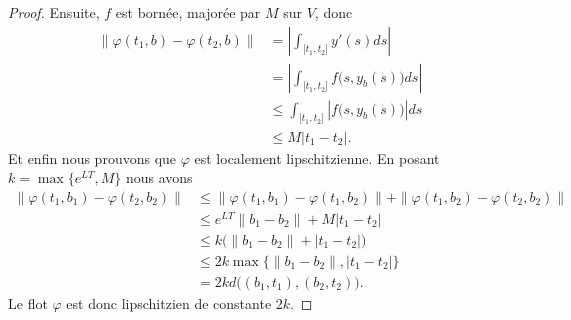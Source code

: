 \begin{proof}
	Ensuite, \( f\) est bornée, majorée par \( M\) sur \( V\), donc
	\begin{subequations}
		\begin{align}
			\| \varphi(t_1,b)-\varphi(t_2,b) \| & =| \int_{\mathopen[ t_1 , t_2 \mathclose]} y'(s)ds |                    \\
			                                    & =| \int_{\mathopen[ t_1 , t_2 \mathclose]}f\big( s,y_b(s) \big)ds |     \\
			                                    & \leq \int_{\mathopen[ t_1 , t_2 \mathclose]}| f\big( s,y_b(s) \big) |ds \\
			                                    & \leq M| t_1-t_2 |.
		\end{align}
	\end{subequations}
	Et enfin nous prouvons que \( \varphi\) est localement lipschitzienne. En posant \( k=\max\{  e^{LT},M \}\) nous avons
	\begin{subequations}
		\begin{align}
			\| \varphi(t_1,b_1)-\varphi(t_2,b_2) \| & \leq \| \varphi(t_1,b_1)-\varphi(t_1,b_2) \|+\| \varphi(t_1,b_2)-\varphi(t_2,b_2) \| \\
			                                        & \leq  e^{LT}\| b_1-b_2 \|+M| t_1-t_2 |                                               \\
			                                        & \leq k\big( \| b_1-b_2 \|+| t_1-t_2 | \big)                                          \\
			                                        & \leq 2k\max\{ \| b_1-b_2 \|,| t_1-t_2 | \}                                           \\
			                                        & =2kd\big(  (b_1,t_1),(b_2,t_2)  \big).
		\end{align}
	\end{subequations}
	Le flot \( \varphi\) est donc lipschitzien de constante \( 2k\).
\end{proof}

